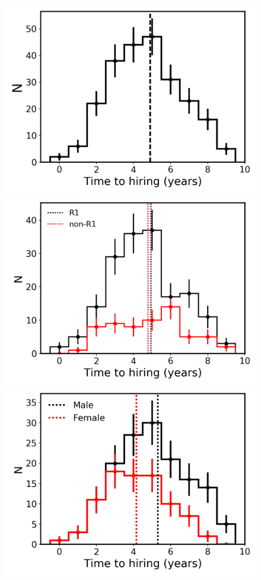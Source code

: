 \documentclass[modern]{aastex62}
\begin{document}
\begin{figure}[!htb]
\center
\includegraphics[scale=.3]{full_hiring_time.png}
\includegraphics[scale=.3]{cc_hiring_time.png}
\includegraphics[scale=.3]{gender_hiring_time.png}

\end{figure}
\end{document}

